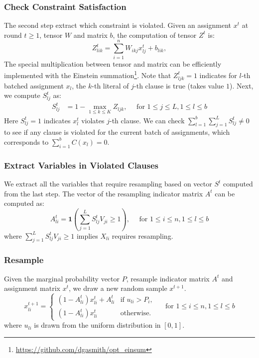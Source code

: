 \documentclass[letterpaper]{article} %
\begin{document}
\subsubsection{Check Constraint Satisfaction} { The second step extract which constraint is violated. Given an assignment $x^t$ at round $t\ge 1$, tensor $W$ and matrix $b$, the computation of tensor $Z^t$ is:}
\begin{equation*}
Z^t_{lik} =\sum_{i=1}^n W_{ikj}  x_{lj}^t+b_{lik},
\end{equation*}
{The special  multiplication between tensor and matrix can be efficiently implemented with the  Einstein summation\footnote{\url{https://github.com/dgasmith/opt_einsum}}.
%
Note that $Z^t_{ljk}=1$ indicates for $l$-th batched assignment $x_l$, the $k$-th literal of $j$-th clause is true (takes value $1$). Next, we compute $S^t_{lj}$ as:}
\begin{align*}
S^t_{lj} &=1-\max_{1\le k\le K} Z_{ljk}, \quad \text{ for } 1\le j\le L, 1\le l\le b
\end{align*}
{Here $S^t_{lj}=1$ indicates $x_l^t$ violates $j$-th clause.
%
We can check $\sum_{l=1}^b\sum_{j=1}^LS^t_{lj}\neq 0$ to see if any clause is violated for the current batch of assignments, which corresponds to $\sum_{i=1}^bC(x_l)= 0$. }

\subsubsection{Extract Variables in Violated Clauses} { We extract all the  variables that require resampling based on vector $S^t$ computed from the last step.
The vector of the resampling indicator matrix $A^t$ can be computed as:}
\begin{equation*}
A^t_{li}=\mathbf{1}\left(\sum_{j=1}^L{S_{lj}^t} V_{ji}\ge 1\right),\quad \text{ for } 1\le i\le n, 1\le l\le b
\end{equation*}
where $\sum_{j=1}^L{S_{lj}^t} V_{ji}\ge 1$ implies $X_{li}$ requires resampling.

\subsubsection{Resample} {Given the marginal probability vector $P$, resample indicator matrix $A^t$ and assignment matrix $x^t$, we draw a new random sample $x^{t+1}$. }
\begin{equation*}
 x_{li}^{t+1}=\begin{cases}
 (1-A^t_{li}) x_{li}^t+A^t_{li}  &\text{if } u_{{li}}>P_i,\\
 (1-A^t_{li}) x_{li}^t &\text{otherwise}.
 \end{cases}\quad \text{ for } 1\le i\le n, 1\le l\le b
\end{equation*}
{where $u_{li}$ is drawn from the uniform distribution in $[0, 1]$. }
\end{document}
